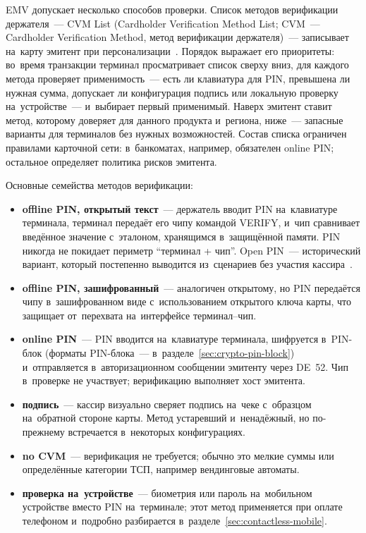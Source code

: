 EMV допускает несколько способов проверки. Список методов верификации
держателя~--- CVM List (Cardholder Verification Method List; CVM~--- Cardholder
Verification Method, метод верификации держателя)~--- записывает на~карту
эмитент при персонализации~\cite{emvco-book3}. Порядок выражает его приоритеты:
во~время транзакции терминал просматривает список сверху вниз, для каждого
метода проверяет применимость~--- есть ли клавиатура для PIN, превышена ли
нужная сумма, допускает ли конфигурация подпись или локальную проверку
на~устройстве~--- и~выбирает первый применимый. Наверх эмитент ставит метод,
которому доверяет для данного продукта и~региона, ниже~--- запасные варианты
для терминалов без нужных возможностей. Состав списка ограничен правилами
карточной сети: в~банкоматах, например, обязателен online PIN; остальное
определяет политика рисков эмитента.

Основные семейства методов верификации:

\begin{itemize}
  \item \textbf{offline PIN, открытый текст}~--- держатель вводит PIN
    на~клавиатуре терминала, терминал передаёт его чипу командой VERIFY,
    и~чип сравнивает введённое значение с~эталоном, хранящимся в~защищённой
    памяти. PIN никогда не покидает периметр \enquote{терминал + чип}. Open
    PIN~--- исторический вариант, который постепенно выводится из~сценариев
    без участия кассира~\cite{emvco-newsletter-q1-2025,visa-tadg}.
  \item \textbf{offline PIN, зашифрованный}~--- аналогичен открытому, но PIN
    передаётся чипу в~зашифрованном виде с~использованием открытого ключа
    карты, что защищает от~перехвата на~интерфейсе терминал--чип.
  \item \textbf{online PIN}~--- PIN вводится на~клавиатуре терминала, шифруется
    в~PIN-блок (форматы PIN-блока~--- в~разделе~\ref{sec:crypto-pin-block})
    и~отправляется в~авторизационном сообщении эмитенту через DE~52. Чип
    в~проверке не участвует; верификацию выполняет хост эмитента.
  \item \textbf{подпись}~--- кассир визуально сверяет подпись на~чеке
    с~образцом на~обратной стороне карты. Метод устаревший и~ненадёжный, но
    по-прежнему встречается в~некоторых конфигурациях.
  \item \textbf{no CVM}~--- верификация не требуется; обычно это мелкие суммы
    или определённые категории ТСП, например вендинговые автоматы.
  \item \textbf{проверка на~устройстве}~--- биометрия или пароль на~мобильном
    устройстве вместо PIN на~терминале; этот метод применяется при оплате
    телефоном и~подробно разбирается
    в~разделе~\ref{sec:contactless-mobile}.
\end{itemize}

